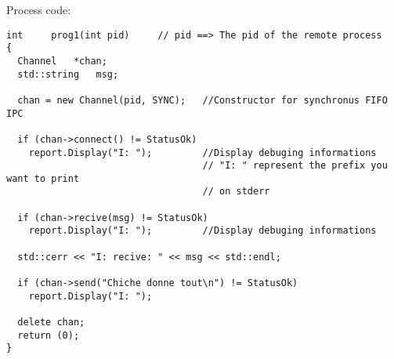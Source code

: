 \documentclass[10pt,a4wide]{article}
\begin{document}
Process code:
\begin{verbatim}
int		prog1(int pid)     // pid ==> The pid of the remote process
{
  Channel	*chan;
  std::string	msg;
  
  chan = new Channel(pid, SYNC);   //Constructor for synchronus FIFO IPC
  
  if (chan->connect() != StatusOk)
    report.Display("I: ");         //Display debuging informations 
                                   // "I: " represent the prefix you want to print
                                   // on stderr
  
  if (chan->recive(msg) != StatusOk)
    report.Display("I: ");         //Display debuging informations

  std::cerr << "I: recive: " << msg << std::endl;
  
  if (chan->send("Chiche donne tout\n") != StatusOk)
    report.Display("I: ");
  
  delete chan;
  return (0);
}
\end{verbatim}
\end{document}
